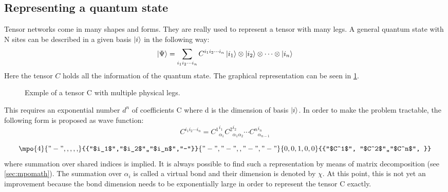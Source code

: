 \subsection{Representing a quantum state}

Tensor networks come in many shapes and forms. They are really used to represent a tensor with many legs. A general quantum state with N sites can be described in a given basis $\ket{i}$ in the following way:
\begin{equation}
    \ket{\Psi} = \sum_{i_1 i_2 \cdots i_n } C^{i_1 i_2 \cdots i_n} \ket{i_1} \otimes \ket{i_2} \otimes \cdots \otimes \ket{i_n}
\end{equation}
Here the tensor $C$ holds all the information of the quantum state. The graphical representation can be seen in \cref{fig:tens:intro:C}.
\begin{figure}[h!]
    \centering


    \caption{Exmple of a tensor C with multiple physical legs.}
    \label{fig:tens:intro:C}
\end{figure}

This requires an exponential number $d^n$ of coefficients C where d is the dimension of basis $\ket{i}$. In order to make the problem tractable, the following form is proposed as wave function:
\begin{equation}
    C^{i_1 i_2 \cdots i_n} = {C^{1}}_{\alpha_1}^{ i_1} {C^{2}}_{\alpha_1 \alpha_2}^{i_2} \cdots  {C^{n}}_{\alpha_{n-1} }^{i_n}
\end{equation}

\begin{equation}
    \mpo{4}{{"-",,,,,}}{{"$i_1$","$i_2$",,"$i_n$","-"}}{{"-","-",,"-","-"}}{{0,0,1,0,0}}{{"$C^1$", "$C^2$",,"$C^n$", }}
\end{equation}
where summation over shared indices is implied. It is always possible to find such a representation by means of matrix decomposition (see \cref{sec:mpomath}). The summation over $\alpha_i$ is called a virtual bond and their dimension is denoted by $\chi$. At this point, this is not yet an improvement because the bond dimension needs to be exponentially large in order to represent the tensor C exactly.

